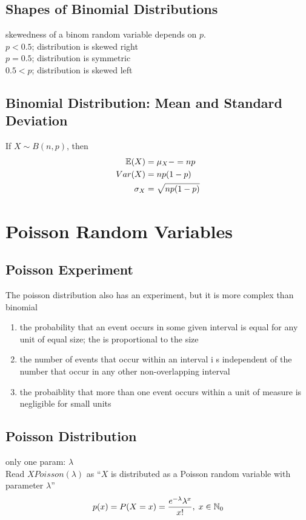 \subsection{Shapes of Binomial Distributions}
skewedness of a binom random variable depends on $p$. \\
$p<0.5$; distribution is skewed right \\
$p=0.5$; distribution is symmetric  \\
$0.5<p$; distribution is skewed left


\subsection{Binomial Distribution: Mean and Standard Deviation}
If $X\sim B(n,p)$, then
\begin{align}
    \mathbb{E}(X)&=\mu_X-=np\\
    Var(X)&=np(1-p)\\
    \sigma_X&=\sqrt{np(1-p)}
\end{align}

\section{Poisson Random Variables}  %


\subsection{Poisson Experiment}  %
The poisson distribution also has an experiment, but it is more complex than  binomial
\begin{enumerate}
    \item the probability that an event occurs in some given interval is equal for any unit of equal size; the  is proportional to the size
    \item the number of events that occur within an interval i s independent of the number that occur in any other non-overlapping interval
    \item the probaiblity that more than one event occurs within a unit of measure is negligible for small units
\end{enumerate}

\subsection{Poisson Distribution}  %
only one param: $\lambda$ \\
Read $X Poisson(\lambda)$ as ``$X$ is distributed as a Poisson random variable with parameter $\lambda$''
\begin{equation}
    p(x)=P(X=x)=\frac{e^{-\lambda}\lambda^x}{x!},\; x\in\NN_0
\end{equation}

